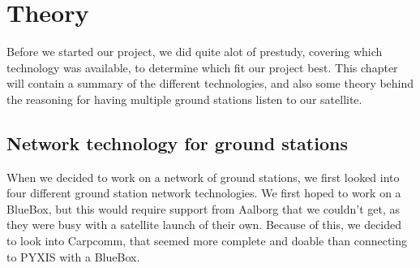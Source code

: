 \chapter{Theory}
Before we started our project, we did quite alot of prestudy, covering which technology was available, to determine which fit our project best. This chapter will contain a summary of the different technologies, and also some theory behind the reasoning for having multiple ground stations listen to our satellite.

\section{Network technology for ground stations}
When we decided to work on a network of ground stations, we first looked into four different ground station network technologies. We first hoped to work on a BlueBox, but this would require support from Aalborg that we couldn't get, as they were busy with a satellite launch of their own. Because of this, we decided to look into Carpcomm, that seemed more complete and doable than connecting to PYXIS with a BlueBox.







